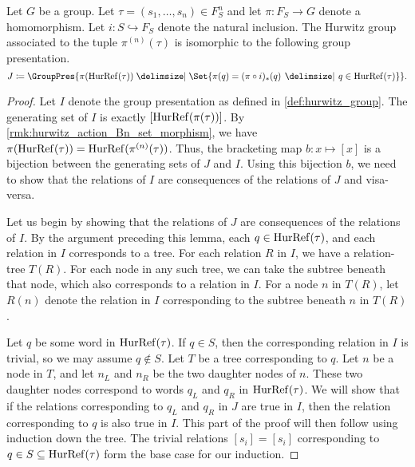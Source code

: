 \begin{lemma}
	\label{lem:hurwitz_group_alt_presentation}
	Let $G$ be a group.
	Let $\tau = (s_1,\ldots,s_n) \in F_S^n$ and let $\pi \colon F_S \to G$ denote a homomorphism.
	Let $i \colon S \hookrightarrow F_S$ denote the natural inclusion.
	The Hurwitz group associated to the tuple $\pi^{(n)}(\tau)$ is isomorphic to the following group presentation.
	\[
		J \coloneq \GroupPres{\pi(\hurref(\tau)) \relations \Set{\pi(q) = (\pi \circ i)_*(q) \given q \in \hurref(\tau)}}
		.\]
\end{lemma}
\begin{proof}
	Let $I$ denote the group presentation as defined in \cref{def:hurwitz_group}.
	The generating set of $I$ is exactly $[\operatorname{HurRef}(\pi(\tau))]$.
	By \cref{rmk:hurwitz_action_Bn_set_morphism}, we have $\pi(\operatorname{HurRef}(\tau)) = \operatorname{HurRef}(\pi^{(n)}(\tau))$.
	Thus, the bracketing map $b \colon x \mapsto [x]$ is a bijection between  the generating sets of $J$ and $I$.
	Using this bijection $b$, we need to show that the relations of  $I$ are consequences of the relations of  $J$ and visa-versa.

	Let us begin by showing that the relations of  $J$ are consequences of the relations of  $I$.
	By the argument preceding this lemma, each $q \in \operatorname{HurRef}(\tau)$, and each relation in $I$ corresponds to a tree.
	For each relation $R$ in $I$, we have a relation-tree $T(R)$.
	For each node in any such tree, we can take the subtree beneath that node, which also corresponds to a relation in $I$.
	For a node $n$ in $T(R)$, let  $R(n)$ denote the relation in $I$ corresponding to the subtree beneath $n$ in  $T(R)$.

	Let $q$ be some word in $\operatorname{HurRef}(\tau)$.
	If $q \in S$, then the corresponding relation in $I$ is trivial, so we may assume  $q \notin S$.
	Let $T$ be a tree corresponding to $q$.
	Let $n$ be a node in $T$, and let $n_L$ and  $n_R$ be the two daughter nodes of $n$.
	These two daughter nodes correspond to words $q_L$ and  $q_R$ in $\operatorname{HurRef}(\tau)$.
	We will show that if the relations corresponding to $q_L$ and  $q_R$ in $J$ are true in $I$, then the relation corresponding to $q$ is also true in $I$.
	This part of the proof will then follow using induction down the tree.
	The trivial relations $[s_i]=[s_i]$ corresponding to $q \in S \subseteq \operatorname{HurRef}(\tau)$ form the base case for our induction.


\end{proof}
